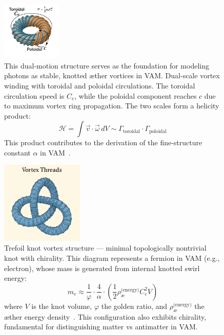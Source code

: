 \begin{figure}[H]
    \centering
    \includegraphics[width=0.25\textwidth]{figures/vortex-fine-structure}
    \caption{
        This dual-motion structure serves as the foundation for modeling photons as stable, knotted æther vortices in VAM.
        Dual-scale vortex winding with toroidal and poloidal circulations. The toroidal circulation speed is $C_e$, while the poloidal component reaches $c$ due to maximum vortex ring propagation. The two scales form a helicity product:
        \[
            \mathcal{H} = \int \vec{v} \cdot \vec{\omega} \, dV \sim \Gamma_{\text{toroidal}} \cdot \Gamma_{\text{poloidal}}
        \]
        This product contributes to the derivation of the fine-structure constant $\alpha$ in VAM~\cite{iskandarani2025b}.
    }
    \label{fig:vortex-3d}
\end{figure}







\begin{figure}[H]
    \centering
    \includegraphics[width=0.35\textwidth]{figures/Tre-foil}
    \caption{Trefoil knot vortex structure — minimal topologically nontrivial knot with chirality. This diagram represents a fermion in VAM (e.g., electron), whose mass is generated from internal knotted swirl energy:
        \[
            m_e \approx \frac{1}{\varphi} \cdot \frac{4}{\alpha} \cdot \left( \frac{1}{2} \rho_{\text{\ae}}^{\text{(energy)}} C_e^2 V \right)
        \]
        where $V$ is the knot volume, $\varphi$ the golden ratio, and $\rho_{\text{\ae}}^{\text{(energy)}}$ the æther energy density~\cite{iskandarani2025a, iskandarani2025b}. This configuration also exhibits chirality, fundamental for distinguishing matter vs antimatter in VAM.}
    \label{fig:trefoil-vortex}
\end{figure}

